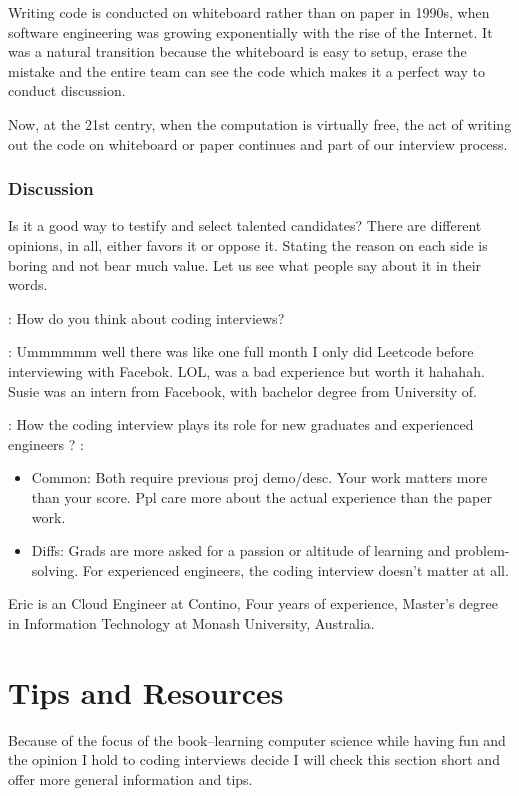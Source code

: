 \documentclass[../main.tex]{subfiles}
\begin{document}
Writing code is conducted on whiteboard rather than on paper in 1990s, when software engineering was growing exponentially with the rise of the Internet. It was a natural transition because the whiteboard is easy to setup, erase the mistake and the entire team can see the code which makes it a perfect way to conduct discussion. 

Now, at the 21st centry, when the computation is virtually free, the act of writing out the code on whiteboard or paper continues and part of our  interview process.

\subsubsection{Discussion}
Is it a good way to testify and select talented candidates? There are different opinions, in all, either favors it or oppose it. Stating the reason on each side is boring and not bear much value. Let us see what people say about it in their words.
\begin{drama}
\mespeaks: How do you think about coding interviews?

\susiespeaks:  Ummmmmm well there was like one full month I only did Leetcode before interviewing with Facebok. LOL, was a bad experience but worth it hahahah. Susie was an intern from Facebook, with bachelor degree from University of.

\dotfill

\mespeaks: How the coding interview plays its role for new graduates and experienced engineers ?
\ericspeaks: 
\begin{itemize}
    \item Common: 
Both require previous proj demo/desc. Your work matters more than your score. Ppl care more about the actual experience than the paper work.\\
\item Diffs:
Grads are more asked for a passion or altitude of learning and problem-solving. For experienced engineers, the coding interview doesn't matter at all.
\end{itemize}
Eric is an Cloud Engineer at Contino, Four years of experience,  Master's degree in Information Technology at Monash University, Australia.
\end{drama}
\section{Tips and Resources}
Because of the focus of the book--learning computer science while having fun and the opinion I hold to coding interviews decide I will check this section short and offer more general information and tips. 
\end{document}
